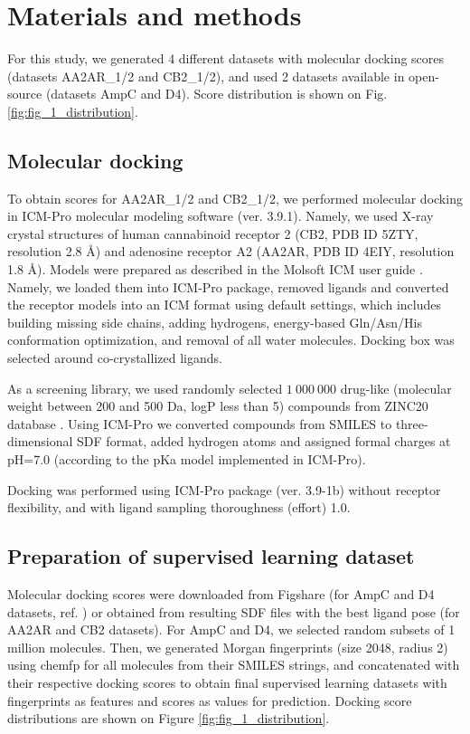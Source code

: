 \section{Materials and methods}
For this study, we generated 4 different datasets with molecular docking scores (datasets AA2AR\_1/2 and CB2\_1/2), and used 2 datasets available in open-source \cite{ultralarge_docking_first} (datasets AmpC and D4). Score distribution is shown on Fig. \ref{fig:fig_1_distribution}.

\subsection{Molecular docking}
To obtain scores for AA2AR\_1/2 and CB2\_1/2, we performed molecular docking in ICM-Pro molecular modeling software (ver. 3.9.1). Namely, we used X-ray crystal structures of human cannabinoid receptor 2 (CB2, PDB ID 5ZTY, resolution 2.8 \AA ) and adenosine receptor A2 (AA2AR, PDB ID 4EIY, resolution 1.8 \AA). Models were prepared as described in the Molsoft ICM user guide \cite{molsoft_guide}. Namely, we loaded them into ICM-Pro package, removed ligands and converted the receptor models into an ICM format using default settings, which includes building missing side chains, adding hydrogens, energy-based Gln/Asn/His conformation optimization, and removal of all water molecules. Docking box was selected around co-crystallized ligands.

As a screening library, we used randomly selected $1\ 000\ 000$ drug-like (molecular weight between 200 and 500 Da, logP less than 5) compounds from ZINC20 database \cite{Irwin2020ZINC20Discovery}. Using ICM-Pro we converted compounds from SMILES to three-dimensional SDF  format, added hydrogen atoms and assigned formal charges at pH=7.0 (according to the pKa model implemented in ICM-Pro). 

Docking was performed using ICM-Pro package (ver. 3.9-1b) without receptor flexibility, and with ligand sampling thoroughness (effort) 1.0.

\subsection{Preparation of supervised learning dataset}
Molecular docking scores were downloaded from Figshare (for AmpC and D4 datasets, ref. \cite{ultralarge_docking_first}) or obtained from resulting SDF files with the best ligand pose (for AA2AR and CB2 datasets). For AmpC and D4, we selected random subsets of 1 million molecules. Then, we generated Morgan fingerprints (size 2048, radius 2) using chemfp \cite{Dalke2019} for all molecules from their SMILES strings, and concatenated with their respective docking scores to obtain final supervised learning datasets with fingerprints as features and scores as values for prediction. Docking score distributions are shown on Figure \ref{fig:fig_1_distribution}.


